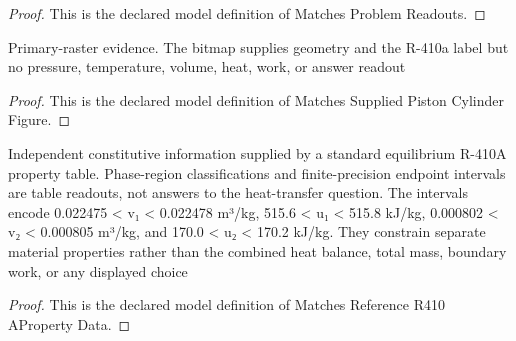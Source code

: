 \begin{proof}
  This is the declared model definition of Matches Problem Readouts.
\end{proof}
\begin{definition}
  \label{def:physics:phyx-mini-0462:phyxminiproblems-problemphyxmini0462-matchessuppliedpistoncylinderfigure}
  Primary-raster evidence. The bitmap supplies geometry and the R-410a label but no pressure, temperature, volume, heat, work, or answer readout
\end{definition}
\begin{proof}
  This is the declared model definition of Matches Supplied Piston Cylinder Figure.
\end{proof}
\begin{definition}
  \label{def:physics:phyx-mini-0462:phyxminiproblems-problemphyxmini0462-matchesreferencer410apropertydata}
  Independent constitutive information supplied by a standard equilibrium R-410A property table. Phase-region classifications and finite-precision endpoint intervals are table readouts, not answers to the heat-transfer question. The intervals encode 0.022475 < v₁ < 0.022478 m³/kg, 515.6 < u₁ < 515.8 kJ/kg, 0.000802 < v₂ < 0.000805 m³/kg, and 170.0 < u₂ < 170.2 kJ/kg. They constrain separate material properties rather than the combined heat balance, total mass, boundary work, or any displayed choice
\end{definition}
\begin{proof}
  This is the declared model definition of Matches Reference R410 AProperty Data.
\end{proof}

